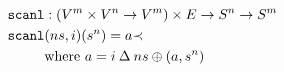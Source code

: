 \documentclass[preview]{standalone}
\begin{document}
\begin{align*}
  \texttt{scanl} &: (V^m \times V^n \rightarrow V^m) \times E
                   \rightarrow S^n \rightarrow S^m \\
  \texttt{scanl} &(ns,i)(s^n) =  a \mathbin{\prec} \\
                 &\text{where}\ a = i \mathbin{\Delta} ns \oplus (a, s^n)
\end{align*}
\end{document}
